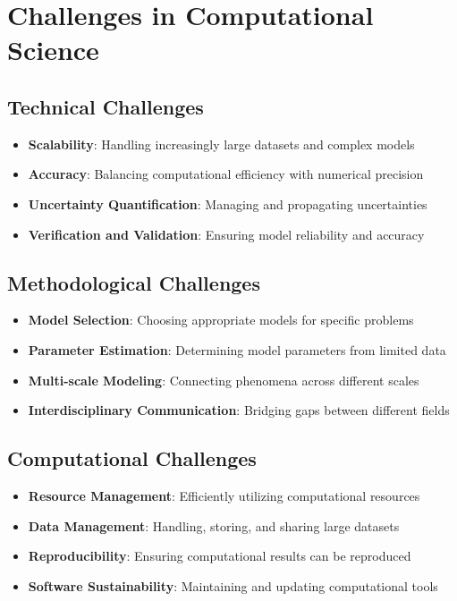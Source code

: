 \section{Challenges in Computational Science}

\subsection{Technical Challenges}
\begin{itemize}
  \item \textbf{Scalability}: Handling increasingly large datasets and complex models
  \item \textbf{Accuracy}: Balancing computational efficiency with numerical precision
  \item \textbf{Uncertainty Quantification}: Managing and propagating uncertainties
  \item \textbf{Verification and Validation}: Ensuring model reliability and accuracy
\end{itemize}

\subsection{Methodological Challenges}
\begin{itemize}
  \item \textbf{Model Selection}: Choosing appropriate models for specific problems
  \item \textbf{Parameter Estimation}: Determining model parameters from limited data
  \item \textbf{Multi-scale Modeling}: Connecting phenomena across different scales
  \item \textbf{Interdisciplinary Communication}: Bridging gaps between different fields
\end{itemize}

\subsection{Computational Challenges}
\begin{itemize}
  \item \textbf{Resource Management}: Efficiently utilizing computational resources
  \item \textbf{Data Management}: Handling, storing, and sharing large datasets
  \item \textbf{Reproducibility}: Ensuring computational results can be reproduced
  \item \textbf{Software Sustainability}: Maintaining and updating computational tools
\end{itemize}

